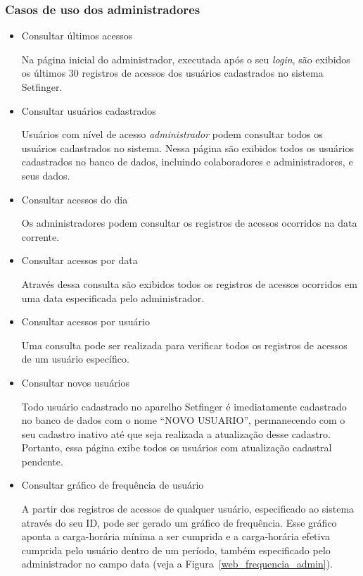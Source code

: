   \subsubsection{Casos de uso dos administradores\label{sec:caso_uso:admin}}
  \begin{itemize}
  
    \item Consultar últimos acessos
    
    Na página inicial do administrador, executada após o seu \textit{login}, são exibidos os últimos 30 registros de acessos dos usuários cadastrados no sistema Setfinger.
    
    
    \item Consultar usuários cadastrados
    
    Usuários com nível de acesso \textit{administrador} podem consultar todos os usuários cadastrados no sistema. Nessa página são exibidos todos os usuários cadastrados no banco de dados, incluindo colaboradores e administradores, e seus dados.
    
    \item Consultar acessos do dia
    
    Os administradores podem consultar os registros de acessos ocorridos na data corrente.
    
    \item Consultar acessos por data
    
    Através dessa consulta são exibidos todos os registros de acessos ocorridos em uma data especificada pelo administrador.
    
    \item Consultar acessos por usuário
    
    Uma consulta pode ser realizada para verificar todos os registros de acessos de um usuário específico.
    
    \item Consultar novos usuários
    
    Todo usuário cadastrado no aparelho Setfinger é imediatamente cadastrado no banco de dados com o nome ``NOVO USUARIO'', permanecendo com o seu cadastro inativo até que seja realizada a atualização desse cadastro. Portanto, essa página exibe todos os usuários com atualização cadastral pendente.
    
    \item Consultar gráfico de frequência de usuário
  
    A partir dos registros de acessos de qualquer usuário, especificado ao sistema através do seu ID, pode ser gerado um gráfico de frequência. Esse gráfico aponta a carga-horária mínima a ser cumprida e a carga-horária efetiva cumprida pelo usuário dentro de um período, também especificado pelo administrador no campo data (veja a Figura~\ref{web_frequencia_admin}).
  

\end{itemize}
